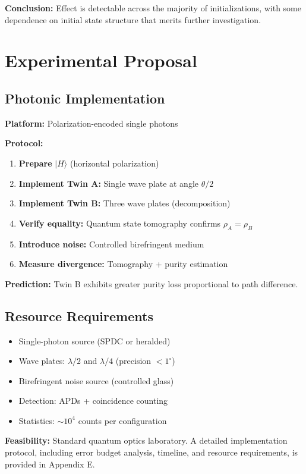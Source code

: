 \documentclass[11pt, onecolumn, letterpaper]{article}
\begin{document}
\noindent\textbf{Conclusion:} Effect is detectable across the majority of initializations, with some dependence on initial state structure that merits further investigation.

\section{Experimental Proposal}

\subsection{Photonic Implementation}
\textbf{Platform:} Polarization-encoded single photons

\textbf{Protocol:}
\begin{enumerate}
    \item \textbf{Prepare} $|H\rangle$ (horizontal polarization)
    \item \textbf{Implement Twin A:} Single wave plate at angle $\theta/2$
    \item \textbf{Implement Twin B:} Three wave plates (decomposition)
    \item \textbf{Verify equality:} Quantum state tomography confirms $\rho_A = \rho_B$
    \item \textbf{Introduce noise:} Controlled birefringent medium
    \item \textbf{Measure divergence:} Tomography + purity estimation
\end{enumerate}
\textbf{Prediction:} Twin B exhibits greater purity loss proportional to path difference.

\subsection{Resource Requirements}
\begin{itemize}
    \item Single-photon source (SPDC or heralded)
    \item Wave plates: $\lambda/2$ and $\lambda/4$ (precision $< 1^\circ$)
    \item Birefringent noise source (controlled glass)
    \item Detection: APDs + coincidence counting
    \item Statistics: $\sim 10^4$ counts per configuration
\end{itemize}
\textbf{Feasibility:} Standard quantum optics laboratory. A detailed implementation protocol, including error budget analysis, timeline, and resource requirements, is provided in Appendix E.
\end{document}
